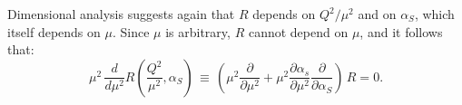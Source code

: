 
Dimensional analysis suggests again that $R$ depends on $Q^2/\mu^2$ and on $\alpha_S$, which itself depends on $\mu$. Since $\mu$ is arbitrary, $R$ cannot depend on $\mu$, and it follows that: 
\begin{equation}
\mu^{2}\,\frac{d}{d\mu^{2}}R\left(\frac{Q^{2}}{\mu^{2}},\alpha_{S}\right)
\,\equiv\, \left( \mu^{2}\frac{\partial}{\partial\mu^{2}} + \mu^{2}\frac{\partial\alpha_{s}}{\partial\mu^{2}}\frac{\partial}{\partial\alpha_{S}}  \right)\,R = 0.
\end{equation}

%
%
%


